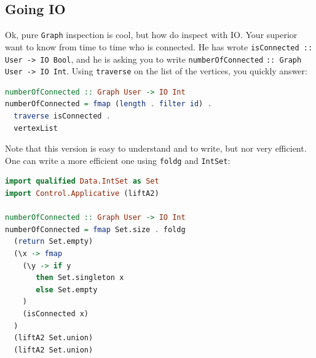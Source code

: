 \documentclass[10pt,a4paper]{article}
\begin{document}
\subsection{Going IO}
Ok, pure \verb|Graph| inspection is cool, but how do inspect with IO. Your superior want to know from time to time who is connected. He has wrote \verb|isConnected ::| \verb|User -> IO Bool|, and he is asking you to write \verb|numberOfConnected| \verb|:: Graph User -> IO Int|. Using \verb|traverse| on the list of the vertices, you quickly answer:
\begin{lstlisting}[language=Haskell, frame=single]
numberOfConnected :: Graph User -> IO Int
numberOfConnected = fmap (length . filter id) .
  traverse isConnected . 
  vertexList
\end{lstlisting}

Note that this version is easy to understand and to write, but nor very efficient. One can write a more efficient one using \verb|foldg| and \verb|IntSet|:
\begin{lstlisting}[language=Haskell, frame=single]
import qualified Data.IntSet as Set
import Control.Applicative (liftA2)

numberOfConnected :: Graph User -> IO Int
numberOfConnected = fmap Set.size . foldg
  (return Set.empty)
  (\x -> fmap
    (\y -> if y
       then Set.singleton x
       else Set.empty
    )
    (isConnected x)
  )
  (liftA2 Set.union)
  (liftA2 Set.union)
\end{lstlisting}
\end{document}
